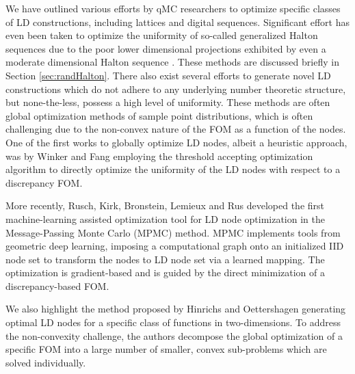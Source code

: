 \documentclass{svproc}
\newcounter{algorithm}%
\begin{document}




We have outlined various efforts by qMC researchers to optimize specific classes of LD constructions, including lattices and digital sequences. Significant effort has even been taken to optimize the uniformity of so-called generalized Halton sequences due to the poor lower dimensional projections exhibited by even a moderate dimensional Halton sequence \cite{kirklem24}. These methods are discussed briefly in Section \ref{sec:randHalton}. There also exist several efforts to generate novel LD constructions which do not adhere to any underlying number theoretic structure, but none-the-less, possess a high level of uniformity. These methods are often global optimization methods of sample point distributions, which is often challenging due to the non-convex nature of the FOM as a function of the nodes. 
One of the first works to globally optimize LD nodes, albeit a heuristic approach, was by Winker and Fang \cite{WinFan97b} employing the threshold accepting optimization algorithm to directly optimize the uniformity of the LD nodes with respect to a discrepancy FOM. 

More recently, Rusch, Kirk, Bronstein, Lemieux and Rus \cite{ruschkirk24} developed the first machine-learning assisted optimization tool for LD node optimization in the Message-Passing Monte Carlo (MPMC) method. MPMC implements tools from geometric deep learning, imposing a computational graph onto an initialized IID node set to transform the nodes to LD node set via a learned mapping. The optimization is gradient-based and is guided by the direct minimization of a discrepancy-based FOM. 

We also highlight the method proposed by Hinrichs and Oettershagen \cite{hinoet16} generating optimal LD nodes for a specific class of functions in two-dimensions. To address the non-convexity challenge, the authors decompose the global optimization of a specific FOM into a large number of smaller, convex sub-problems which are solved individually. 
\end{document}
